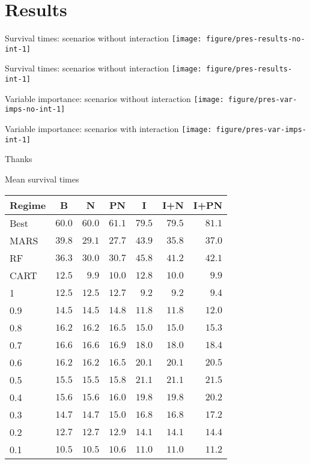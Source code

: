 \documentclass[handout]{beamer}
\begin{document}
\section{Results} %
\label{sec:results}


\begin{frame}[c]{Survival times: scenarios without interaction}
\centering
  \texttt{[image: figure/pres-results-no-int-1]} 
\end{frame}

\begin{frame}[c]{Survival times: scenarios without interaction}
  \centering
  \texttt{[image: figure/pres-results-int-1]} 
\end{frame}

\begin{frame}[c]{Variable importance: scenarios without interaction}
\centering
  \texttt{[image: figure/pres-var-imps-no-int-1]} 
\end{frame}

\begin{frame}[c]{Variable importance: scenarios with interaction}
  \centering
  \texttt{[image: figure/pres-var-imps-int-1]} 
\end{frame}




\begin{frame}[standout]
  Thanks
\end{frame}

\appendix

\begin{frame}[c]{Mean survival times}
  \begin{table}
  \small
  \centering
  \begin{tabular}{lrrrrrr}
  \toprule \multicolumn{1}{c}{Regime}&\multicolumn{1}{c}{B}&\multicolumn{1}{c}{N}&\multicolumn{1}{c}{PN}&\multicolumn{1}{c}{I}&\multicolumn{1}{c}{I+N}&\multicolumn{1}{c}{I+PN}\tabularnewline
  \midrule
  Best&$60.0$&$60.0$&$61.1$&$79.5$&$79.5$&$81.1$\tabularnewline
  MARS&$39.8$&$29.1$&$27.7$&$43.9$&$35.8$&$37.0$\tabularnewline
  RF&$36.3$&$30.0$&$30.7$&$45.8$&$41.2$&$42.1$\tabularnewline
  CART&$12.5$&$ 9.9$&$10.0$&$12.8$&$10.0$&$ 9.9$\tabularnewline
  1&$12.5$&$12.5$&$12.7$&$ 9.2$&$ 9.2$&$ 9.4$\tabularnewline
  0.9&$14.5$&$14.5$&$14.8$&$11.8$&$11.8$&$12.0$\tabularnewline
  0.8&$16.2$&$16.2$&$16.5$&$15.0$&$15.0$&$15.3$\tabularnewline
  0.7&$16.6$&$16.6$&$16.9$&$18.0$&$18.0$&$18.4$\tabularnewline
  0.6&$16.2$&$16.2$&$16.5$&$20.1$&$20.1$&$20.5$\tabularnewline
  0.5&$15.5$&$15.5$&$15.8$&$21.1$&$21.1$&$21.5$\tabularnewline
  0.4&$15.6$&$15.6$&$16.0$&$19.8$&$19.8$&$20.2$\tabularnewline
  0.3&$14.7$&$14.7$&$15.0$&$16.8$&$16.8$&$17.2$\tabularnewline
  0.2&$12.7$&$12.7$&$12.9$&$14.1$&$14.1$&$14.4$\tabularnewline
  0.1&$10.5$&$10.5$&$10.6$&$11.0$&$11.0$&$11.2$\tabularnewline
  \bottomrule
  \end{tabular}
  \end{table}
\end{frame}
\end{document}
